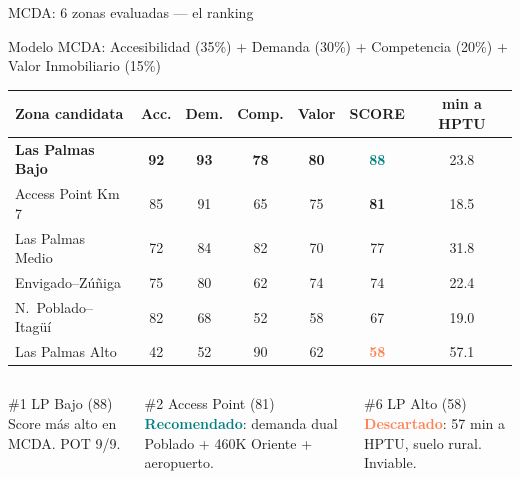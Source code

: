 \documentclass[aspectratio=169, 11pt]{beamer}
\newcommand{\highlight}[1]{\textcolor{teal}{\textbf{#1}}}
\newcommand{\danger}[1]{\textcolor{coral}{\textbf{#1}}}
\begin{document}
\begin{frame}{MCDA: 6 zonas evaluadas --- el ranking}

\begin{center}
{\small Modelo MCDA: Accesibilidad (35\%) + Demanda (30\%) + Competencia (20\%) + Valor Inmobiliario (15\%)}
\end{center}

\vspace{6pt}
\begin{center}
{\small
\begin{tabular}{@{}lcccccc@{}}
\toprule
\textbf{Zona candidata} & \textbf{Acc.} & \textbf{Dem.} & \textbf{Comp.} & \textbf{Valor} & \textbf{SCORE} & \textbf{min a HPTU} \\
\midrule
\rowcolor{teal!12}
\textbf{Las Palmas Bajo} & \textbf{92} & \textbf{93} & \textbf{78} & \textbf{80} & \highlight{88} & 23.8 \\
\rowcolor{coral!4}
Access Point Km 7 & 85 & 91 & 65 & 75 & \textbf{81} & 18.5 \\
Las Palmas Medio & 72 & 84 & 82 & 70 & 77 & 31.8 \\
Envigado--Zúñiga & 75 & 80 & 62 & 74 & 74 & 22.4 \\
N.\ Poblado--Itagüí & 82 & 68 & 52 & 58 & 67 & 19.0 \\
\rowcolor{coral!6}
Las Palmas Alto & 42 & 52 & 90 & 62 & \danger{58} & 57.1 \\
\bottomrule
\end{tabular}
}
\end{center}

\vspace{6pt}
\begin{columns}[T]
\begin{block}{\small \#1 LP Bajo (88)}
\footnotesize Score más alto en MCDA. POT 9/9.
\end{block}

\begin{exampleblock}{\small \#2 Access Point (81)}
\footnotesize \highlight{Recomendado}: demanda dual Poblado + 460K Oriente + aeropuerto.
\end{exampleblock}

\begin{alertblock}{\small \#6 LP Alto (58)}
\footnotesize \danger{Descartado}: 57 min a HPTU, suelo rural. Inviable.
\end{alertblock}
\end{columns}
\end{frame}
\end{document}
